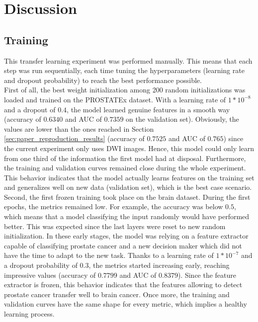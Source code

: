 \section{Discussion}

\subsection{Training}
\setlength{\marginparwidth}{3cm}\leavevmode {}This transfer learning experiment was performed manually. This means that each step was run sequentially, each time tuning the hyperparameters (learning rate and dropout probability) to reach the best performance possible.\\
First of all, the best weight initialization among 200 random initializations was loaded and trained on the PROSTATEx dataset. With a learning rate of $1*10^{-8}$ and a dropout of $0.4$, the model learned genuine features in a smooth way (accuracy of $0.6340$ and AUC of $0.7359$ on the validation set). Obviously, the values are lower than the ones reached in Section \ref{sec:paper_reproduction_results} (accuracy of $0.7525$ and AUC of $0.765$) since the current experiment only uses DWI images. Hence, this model could only learn from one third of the information the first model had at disposal. Furthermore, the training and validation curves remained close during the whole experiment. This behavior indicates that the model actually learns features on the training set and generalizes well on new data (validation set), which is the best case scenario.\\
Second, the first frozen training took place on the brain dataset. During the first epochs, the metrics remained low. For example, the accuracy was below $0.5$, which means that a model classifying the input randomly would have performed better. This was expected since the last layers were reset to new random initialization. In these early stages, the model was relying on a feature extractor capable of classifying prostate cancer and a new decision maker which did not have the time to adapt to the new task. Thanks to a learning rate of $1*10^{-7}$ and a dropout probability of $0.3$, the metrics started increasing early, reaching impressive values (accuracy of $0.7799$ and AUC of $0.8379$). Since the feature extractor is frozen, this behavior indicates that the features allowing to detect prostate cancer transfer well to brain cancer. Once more, the training and validation curves have the same shape for every metric, which implies a healthy learning process.\\
